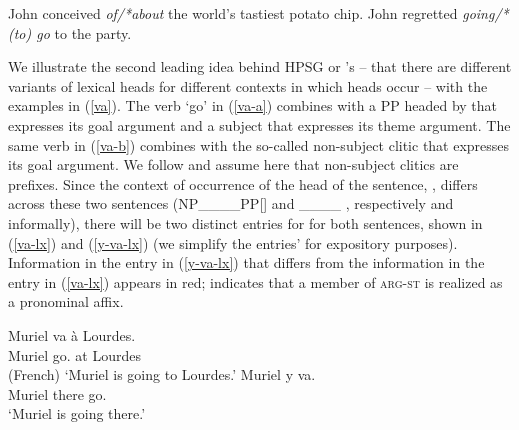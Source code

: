 \documentclass[output=paper,biblatex,babelshorthands,newtxmath,draftmode,colorlinks,citecolor=brown]{langscibook}
\begin{document}
\eal
\label{select}
\ex\label{select-a}John conceived \emph{of/*about} the world's tastiest potato chip.
\ex\label{select-b} John regretted \emph{going/*(to) go} to the party.
\zl


We illustrate the second leading idea behind HPSG or \lfg's\indexlfg {} -- that there
are different variants of lexical heads for different contexts in which heads occur -- with the
 examples in (\ref{va}). The verb  `go' in (\ref{va-a}) combines with a PP
headed by  that expresses its goal argument and a subject that expresses its theme
argument. The same verb in (\ref{va-b}) combines with the so-called non-subject clitic
 that expresses its goal argument. We follow \citet{MillerandSag1997} and assume here that
 non-subject clitics are prefixes. Since the context of occurrence of the head of the
sentence, , differs across these two sentences (\textsc{NP\_\_\_\_PP}[] and
 \_\_\_\_ , respectively and informally), there will be two distinct entries for
 for both sentences, shown in (\ref{va-lx}) and (\ref{y-va-lx}) (we simplify the
entries'  for expository purposes). Information in the entry in
(\ref{y-va-lx}) that differs from the information in the entry in (\ref{va-lx}) appears in red;
 indicates that a member of \textsc{arg-st} is realized as a pronominal affix. 

\eal
\label{va}
\ex\label{va-a} 
\gll Muriel va à Lourdes. \\
     Muriel go. at Lourdes \\\hfill(French)
     \glt `Muriel is going to Lourdes.'
\ex\label{va-b}
\gll Muriel y va. \\
     Muriel there go. \\
 \glt `Muriel is going there.'
\zl

\ea
\label{va-lx}
\z
\end{document}
